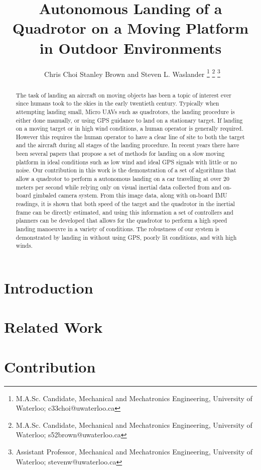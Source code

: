 \documentclass[letterpaper, 10 pt, conference]{ieeeconf}
\title{\large \textbf Autonomous Landing of a Quadrotor on a Moving Platform in
Outdoor Environments}
\author{\
Chris Choi\authorrefmark{1} Stanley Brown\authorrefmark{2} and  Steven L. Waslander\authorrefmark{3}
\thanks{\superscript{*} M.A.Sc. Candidate, Mechanical and Mechatronics Engineering, University of Waterloo; c33choi@uwaterloo.ca}
\thanks{\superscript{2} M.A.Sc. Candidate, Mechanical and Mechatronics Engineering, University of Waterloo; s52brown@uwaterloo.ca}
\thanks{\superscript{\dag} Assistant Professor, Mechanical and Mechatronics Engineering, University of Waterloo; stevenw@uwaterloo.ca}
\vspace{0.5in}
}
\begin{document}
\maketitle
\thispagestyle{empty}
\pagestyle{empty}

\begin{abstract}
The task of landing an aircraft on moving objects has been a topic of interest
ever since humans took to the skies in the early twentieth century. Typically
when attempting landing small, Micro UAVs such as quadrotors, the landing
procedure is either done manually, or using GPS guidance to land on a
stationary target. If landing on a moving target or in high wind conditions, a
human operator is generally required. However this requires the human operator
to have a clear line of site to both the target and the aircraft during all
stages of the landing procedure. In recent years there have been several papers
that propose a set of methods for landing on a slow moving platform in ideal
conditions such as low wind and ideal GPS signals with little or no noise. Our
contribution in this work is the demonstration of a set of algorithms that
allow a quadrotor to perform a autonomous landing on a car travelling at over 20
meters per second while relying only on visual inertial data collected from and
on-board gimbaled camera system. From this image data, along with on-board IMU
readings, it is shown that both speed of the target and the quadrotor in the
inertial frame can be directly estimated, and using this information a set of
controllers and planners can be developed that allows for the quadrotor to
perform a high speed landing manoeuvre in a variety of conditions. The
robustness of our system is demonstrated by landing in without using GPS,
poorly lit conditions, and with high winds.
\end{abstract}


\section{Introduction}

\section{Related Work}

\section{Contribution}
\end{document}
